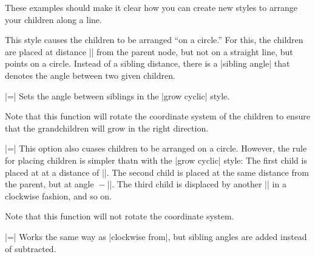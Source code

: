 \begin{itemize}
  These examples should make it clear how you can create new styles to
  arrange your children along a line.

  This style causes the children to be arranged ``on a circle.'' For
  this, the children are placed at distance |\tikzleveldistance| from
  the parent node, but not on a straight line, but points on a
  circle. Instead of a sibling distance, there is a |sibling angle|
  that denotes the angle between two given children.
  \begin{itemize}
    |=|
    Sets the angle between siblings in the |grow cyclic| style.
  \end{itemize}
  Note that this function will rotate the coordinate system of the
  children to ensure that the grandchildren will grow in the right
  direction.
\begin{codeexample}[]
\end{codeexample}

  |=|
  This option also cuases children to be arranged on a
  circle. However, the rule for placing children is simpler thatn with
  the |grow cyclic| style: The first child is placed at
   at a distance of |\tikzleveldistance|. The second child
  is placed at the same distance from the parent, but at angle
  ${}-{}$|\tikzsiblingangle|. The third child is displaced
  by another |\tikzsiblingangle| in a clockwise fashion, and so on. 

  Note that this function will not rotate the coordinate system.
\begin{codeexample}[]
\end{codeexample}
  |=|
  Works the same way as |clockwise from|, but sibling angles are added
  instead of subtracted.
\end{itemize}

